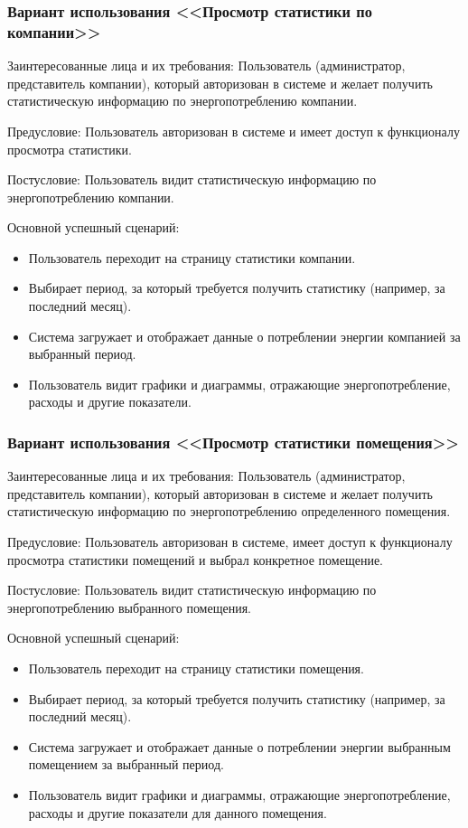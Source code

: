 \subsubsection{Вариант использования <<Просмотр статистики по компании>>}

Заинтересованные лица и их требования: Пользователь (администратор, представитель компании), который авторизован в системе и желает получить статистическую информацию по энергопотреблению компании.

Предусловие: Пользователь авторизован в системе и имеет доступ к функционалу просмотра статистики.

Постусловие: Пользователь видит статистическую информацию по энергопотреблению компании.

Основной успешный сценарий:
\begin{itemize}
	\item Пользователь переходит на страницу статистики компании.
	\item Выбирает период, за который требуется получить статистику (например, за последний месяц).
	\item Система загружает и отображает данные о потреблении энергии компанией за выбранный период.
	\item Пользователь видит графики и диаграммы, отражающие энергопотребление, расходы и другие показатели.
\end{itemize}

\subsubsection{Вариант использования <<Просмотр статистики помещения>>}

Заинтересованные лица и их требования: Пользователь (администратор, представитель компании), который авторизован в системе и желает получить статистическую информацию по энергопотреблению определенного помещения.

Предусловие: Пользователь авторизован в системе, имеет доступ к функционалу просмотра статистики помещений и выбрал конкретное помещение.

Постусловие: Пользователь видит статистическую информацию по энергопотреблению выбранного помещения.

Основной успешный сценарий:
\begin{itemize}
	\item Пользователь переходит на страницу статистики помещения.
	\item Выбирает период, за который требуется получить статистику (например, за последний месяц).
	\item Система загружает и отображает данные о потреблении энергии выбранным помещением за выбранный период.
	\item Пользователь видит графики и диаграммы, отражающие энергопотребление, расходы и другие показатели для данного помещения.
\end{itemize}


